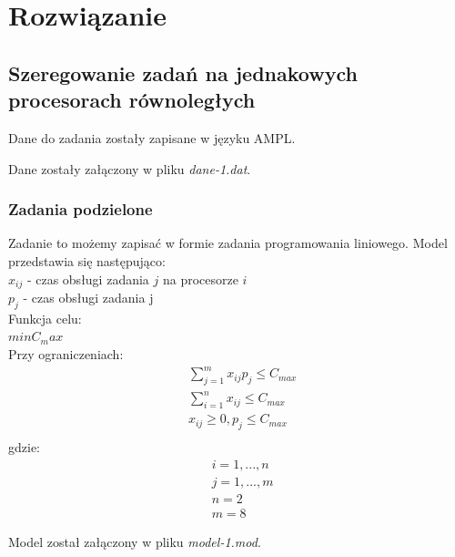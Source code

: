 \documentclass[
    12pt, %
]{../fphw}
\begin{document}
\newpage
\section{Rozwiązanie}
\subsection{Szeregowanie zadań na jednakowych procesorach równoległych}
Dane do zadania zostały zapisane w języku AMPL.

Dane zostały załączony w pliku \textit{dane-1.dat}.
\subsubsection{Zadania podzielone}
Zadanie to możemy zapisać w formie zadania programowania liniowego.
Model przedstawia się następująco: \\
\(x_{ij}\) - czas obsługi zadania \(j\) na procesorze \(i\) \\
\(p_j\) - czas obsługi zadania j \\
Funkcja celu: \\
\(min C_max\) \\
Przy ograniczeniach: \\
\begin{align*}
     & \sum^m_{j=1}x_{ij}p_j \leq C_{max} \\
     & \sum^n_{i=1}x_{ij} \leq C_{max}    \\
     & x_{ij} \geq 0, p_j \leq C_{max}    \\
\end{align*}
gdzie: \\
\begin{align*}
     & i = 1, ..., n \\
     & j = 1, ..., m \\
     & n = 2         \\
     & m = 8
\end{align*}

\newpage


Model został załączony w pliku \textit{model-1.mod}.
\end{document}
